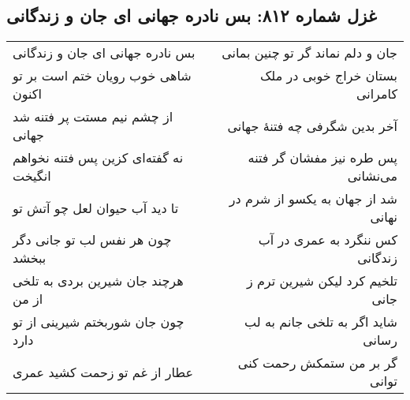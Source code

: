 \begin{center}
\section*{غزل شماره ۸۱۲: بس نادره جهانی ای جان و زندگانی}
\label{sec:812}
\begin{longtable}{l p{0.5cm} r}
بس نادره جهانی ای جان و زندگانی
&&
جان و دلم نماند گر تو چنین بمانی
\\
شاهی خوب رویان ختم است بر تو اکنون
&&
بستان خراج خوبی در ملک کامرانی
\\
از چشم نیم مستت پر فتنه شد جهانی
&&
آخر بدین شگرفی چه فتنهٔ جهانی
\\
نه گفته‌ای کزین پس فتنه نخواهم انگیخت
&&
پس طره نیز مفشان گر فتنه می‌نشانی
\\
تا دید آب حیوان لعل چو آتش تو
&&
شد از جهان به یکسو از شرم در نهانی
\\
چون هر نفس لب تو جانی دگر ببخشد
&&
کس ننگرد به عمری در آب زندگانی
\\
هرچند جان شیرین بردی به تلخی از من
&&
تلخیم کرد لیکن شیرین ترم ز جانی
\\
چون جان شوربختم شیرینی از تو دارد
&&
شاید اگر به تلخی جانم به لب رسانی
\\
عطار از غم تو زحمت کشید عمری
&&
گر بر من ستمکش رحمت کنی توانی
\\
\end{longtable}
\end{center}
